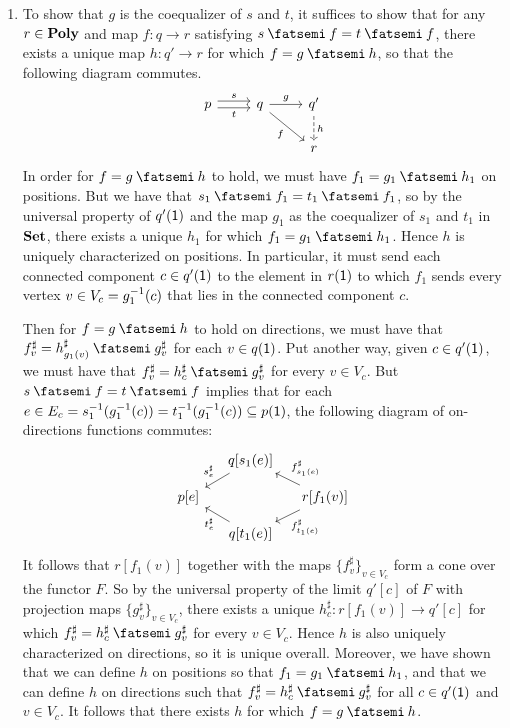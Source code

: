 \documentclass[Book-Poly]{subfiles}
\begin{document}
\begin{exercise}
\begin{solution}
\begin{enumerate}
    \item To show that $g$ is the coequalizer of $s$ and $t$, it suffices to show that for any $r \in \mathbf{Poly}$ and map $f \colon q \to r$ satisfying $s \then f = t \then f$, there exists a unique map $h \colon q' \to r$ for which $f = g \then h$, so that the following diagram commutes.
    \begin{equation*} %
    \begin{tikzcd}
        p \ar[r, "s", shift left] \ar[r, "t"', shift right] & q \ar[r, "g"] \ar[dr, "f"'] & q' \ar[d, "h", dashed] \\
        & & r
    \end{tikzcd}
    \end{equation*}
    In order for $f = g \then h$ to hold, we must have $f_1 = g_1 \then h_1$ on positions.
    But we have that $s_1 \then f_1 = t_1 \then f_1$, so by the universal property of $q'(\textsf{1})$ and the map $g_1$ as the coequalizer of $s_1$ and $t_1$ in $\mathbf{Set}$, there exists a unique $h_1$ for which $f_1 = g_1 \then h_1$.
    Hence $h$ is uniquely characterized on positions.
    In particular, it must send each connected component $c \in q'(\textsf{1})$ to the element in $r(\textsf{1})$ to which $f_1$ sends every vertex $v \in V_c = g_1^{-1}(c)$ that lies in the connected component $c$.
    
    Then for $f = g \then h$ to hold on directions, we must have that $f^\sharp_v = h^\sharp_{g_1(v)} \then g^\sharp_v$ for each $v \in q(\textsf{1})$.
    Put another way, given $c \in q'(\textsf{1})$, we must have that $f^\sharp_v = h^\sharp_c \then g^\sharp_v$ for every $v \in V_c$.
    But $s \then f = t \then f$ implies that for each $e \in E_c = s_1^{-1}(g_1^{-1}(c)) = t_1^{-1}(g_1^{-1}(c)) \subseteq p(\textsf{1})$, the following diagram of on-directions functions commutes:
    \[
    \begin{tikzcd}[sep=small]
        & q[s_1(e)] \ar[dl, "s^\sharp_e"'] \\
        p[e] & & r[f_1(v)] \ar[ul, "f^\sharp_{s_1(e)}"'] \ar[dl, "f^\sharp_{t_1(e)}"] \\
        & q[t_1(e)] \ar[ul, "t^\sharp_e"]
    \end{tikzcd}
    \]
    It follows that $r[f_1(v)]$ together with the maps $\{f^\sharp_v\}_{v \in V_c}$ form a cone over the functor $F$.
    So by the universal property of the limit $q'[c]$ of $F$ with projection maps $\{g^\sharp_v\}_{v \in V_c}$, there exists a unique $h^\sharp_c \colon r[f_1(v)] \to q'[c]$ for which $f^\sharp_v = h^\sharp_c \then g^\sharp_v$ for every $v \in V_c$.
    Hence $h$ is also uniquely characterized on directions, so it is unique overall.
    Moreover, we have shown that we can define $h$ on positions so that $f_1 = g_1 \then h_1$, and that we can define $h$ on directions such that $f^\sharp_v = h^\sharp_c \then g^\sharp_v$ for all $c \in q'(\textsf{1})$ and $v \in V_c$.
    It follows that there exists $h$ for which $f = g \then h$.
\end{enumerate}
\end{solution}
\end{exercise}
\end{document}
